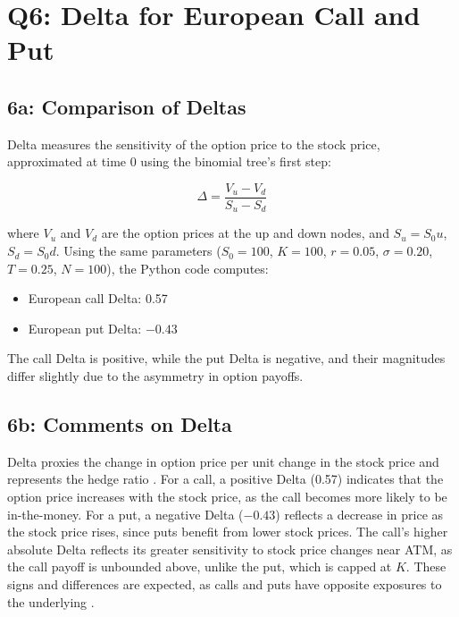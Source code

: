 \documentclass{article}
\begin{document}
\section*{Q6: Delta for European Call and Put}

\subsection*{6a: Comparison of Deltas}

Delta measures the sensitivity of the option price to the stock price, approximated at time 0 using the binomial tree’s first step:

\begin{equation}
\Delta = \frac{V_u - V_d}{S_u - S_d}
\end{equation}

where $V_u$ and $V_d$ are the option prices at the up and down nodes, and $S_u = S_0 u$, $S_d = S_0 d$. Using the same parameters ($S_0 = 100$, $K = 100$, $r = 0.05$, $\sigma = 0.20$, $T = 0.25$, $N = 100$), the Python code computes:

\begin{itemize}
    \item European call Delta: 0.57
    \item European put Delta: $-0.43$
\end{itemize}

The call Delta is positive, while the put Delta is negative, and their magnitudes differ slightly due to the asymmetry in option payoffs.

\subsection*{6b: Comments on Delta}

Delta proxies the change in option price per unit change in the stock price and represents the hedge ratio \citep{hull2018options}. For a call, a positive Delta (0.57) indicates that the option price increases with the stock price, as the call becomes more likely to be in-the-money. For a put, a negative Delta ($-0.43$) reflects a decrease in price as the stock price rises, since puts benefit from lower stock prices. The call’s higher absolute Delta reflects its greater sensitivity to stock price changes near ATM, as the call payoff is unbounded above, unlike the put, which is capped at $K$. These signs and differences are expected, as calls and puts have opposite exposures to the underlying \citep{shreve2004stochastic}.
\end{document}
